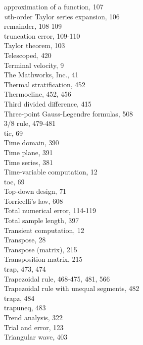 \documentclass[../main.tex]{subfiles}
\begin{document}
\begin{multicols}{3}
    \hspace*{3mm}approximation of a function, 107\\
    \hspace*{3mm}\textit{n}th-order Taylor series expansion, 106\\
    \hspace*{3mm}remainder, 108-109\\
    \hspace*{3mm}truncation error, 109-110\\
    Taylor theorem, 103\\
    Telescoped, 420\\
    Terminal velocity, 9\\
    The Mathworks, Inc., 41\\
    Thermal stratification, 452\\
    Thermocline, 452, 456\\
    Third divided difference, 415\\
    Three-point Gauss-Legendre formulas, 508\\
    3/8 rule, 479-481\\
    tic, 69\\
    Time domain, 390\\
    Time plane, 391\\
    Time series, 381\\
    Time-variable computation, 12\\
    toc, 69\\
    Top-down design, 71\\
    Torricelli's law, 608\\
    Total numerical error, 114-119\\
    Total sample length, 397\\
    Transient computation, 12\\
    Transpose, 28\\
    Transpose (matrix), 215\\
    Transposition matrix, 215\\
    trap, 473, 474\\
    Trapezoidal rule, 468-475, 481, 566\\
    Trapezoidal rule with unequal segments, 482\\
    trapz, 484\\
    trapuneq, 483\\
    Trend analysis, 322\\
    Trial and error, 123\\
    Triangular wave, 403\\

\end{multicols}
\end{document}
